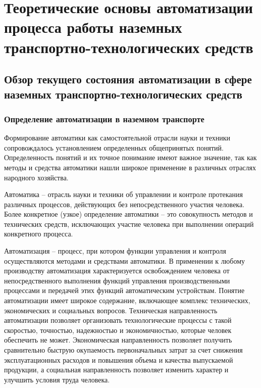 \chapter{Теоретические основы автоматизации процесса работы наземных транспортно-технологических средств}\label{ch:ch1}

\section{Обзор текущего состояния автоматизации в сфере наземных транспортно-технологических средств}\label{sec:ch1/sec1}

\subsection{Определение автоматизации в наземном транспорте}\label{subsec:ch1/sec1/sub1}

Формирование автоматики как самостоятельной отрасли науки и техники сопровождалось установлением определенных общепринятых понятий. Определенность понятий и их точное понимание имеют важное значение, так как методы и средства автоматики нашли широкое применение в различных отраслях народного хозяйства.

Автоматика -- отрасль науки и техники об управлении и контроле протекания различных процессов, действующих без непосредственного участия человека. Более конкретное (узкое) определение автоматики -- это совокупность методов и технических средств, исключающих участие человека при выполнении операций конкретного процесса.

Автоматизация -- процесс, при котором функции управления и контроля осуществляются методами и средствами автоматики. В применении к любому производству автоматизация характеризуется освобождением человека от непосредственного выполнения функций управления производственными процессами и передачей этих функций автоматическим устройствам. Понятие автоматизации имеет широкое содержание, включающее комплекс технических, экономических и социальных вопросов. Техническая направленность автоматизации позволяет организовать технологические процессы с такой скоростью, точностью, надежностью и экономичностью, которые человек обеспечить не может. Экономическая направленность позволяет получить сравнительно быструю окупаемость первоначальных затрат за счет снижения эксплуатационных расходов и повышения объема и качества выпускаемой продукции, а социальная направленность позволяет изменить характер и улучшить условия труда человека.

